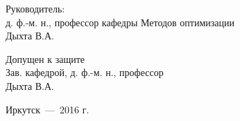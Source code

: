 \begin{titlepage}
{\begin{center}
\begin{multicols}{2}
\begin{flushleft}
\begin{spacing}{1.0}
          Руководитель: 
          \\д. ф.-м. н., профессор кафедры Методов оптимизации 
          \\ 
          \underline{\phantom{Четкая подпись}} Дыхта В.А. 
          \vspace{0.5cm} 
          
          Допущен к защите 
          \\Зав. кафедрой, д. ф.-м. н., профессор 
          \\ 
          \underline{\phantom{Четкая подпись}} Дыхта В.А. 
        \end{spacing} 
      \end{flushleft} 
    \end{multicols} 
    \vspace{1.3cm} 
    Иркутск~---~2016 г. 
  \end{center} 
}
\end{titlepage}

